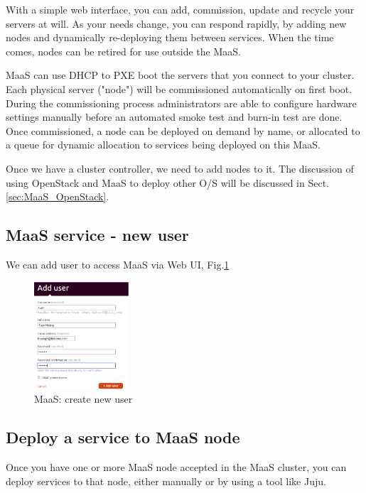 With a simple web interface, you can add, commission, update and recycle your
servers at will. As your needs change, you can respond rapidly, by adding new
nodes and dynamically re-deploying them between services. When the time comes,
nodes can be retired for use outside the MaaS.  

MaaS can use DHCP to PXE boot the servers that you connect to your cluster.
Each physical server ("node") will be commissioned automatically on first
boot. During the commissioning process administrators are able to
configure hardware settings manually before an automated smoke
test and burn-in test are done. Once commissioned, a node can
be deployed on demand by name, or allocated to a queue for
dynamic allocation to services being deployed on this MaaS.

Once we have a cluster controller, we need to add nodes to it. The discussion of
using OpenStack and MaaS to deploy other O/S will be discussed in
Sect.\ref{sec:MaaS_OpenStack}. 


\subsection{MaaS service - new user}
\label{sec:MaaS_create_user}

We can add user to access MaaS via Web UI, Fig.\ref{fig:MaaS_new_user}

\begin{figure}[hbt]
  \centerline{\includegraphics[height=4cm,
    angle=0]{./images/MaaS_new_user.eps}}
\caption{MaaS: create new user}
\label{fig:MaaS_new_user}
\end{figure}


\subsection{Deploy a service to MaaS node}
\label{sec:MaaS_deploy_service}

Once you have one or more MaaS node accepted in the MaaS cluster, you can deploy
services to that node, either manually or by using a tool like Juju.


